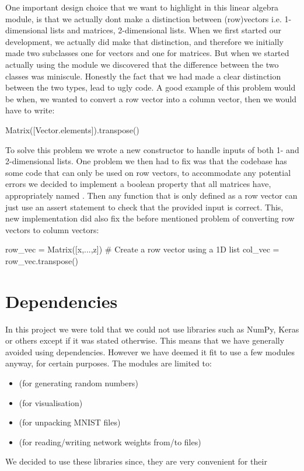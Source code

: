 \documentclass[a4paper,oneside,article,english]{memoir}
\begin{document}
One important design choice that we want to highlight in this linear algebra
module, is that we actually dont make a distinction between (row)vectors i.e.
1-dimensional lists and matrices, 2-dimensional lists. When we first started our
development, we actually did make that distinction, and therefore we initially
made two subclasses one for vectors and one for matrices. But when we started
actually using the module we discovered that the difference between the two
classes was miniscule. Honestly the fact that we had made a clear distinction
between the two types, lead to ugly code. A good example of this problem would
be when, we wanted to convert a row vector into a column vector, then we would
have to write:
\begin{python}
Matrix([Vector.elements]).transpose()
\end{python}
To solve this problem we wrote a new 
constructor to handle inputs of both 1- and 2-dimensional lists. One problem we
then had to fix was that the codebase has some code that can only be used on row
vectors, to accommodate any potential errors we decided to implement a boolean
property that all matrices have, appropriately named
. Then any function that is only defined as
a row vector can just use an assert statement to check that the provided
 input is correct. This, new implementation did also fix
the before mentioned problem of converting row vectors to column vectors:
\begin{python}
row_vec = Matrix([x,...,z]) # Create a row vector using a 1D list 
col_vec = row_vec.transpose() 
\end{python}



\section{Dependencies}  
\label{sec:dependencies}
In this project we were told that we could not use libraries such as NumPy,
Keras or others except if it was stated otherwise. This means that we have
generally avoided using dependencies. However we have deemed it fit to use a few
modules anyway, for certain purposes. The modules are limited to: 
\begin{itemize}
  \item
    \href{https://docs.python.org/3/library/random.html}{\underline{}}
    (for generating random numbers)
  \item \href{https://matplotlib.org}{\underline{}} (for
    visualisation)
  \item
    \href{https://docs.python.org/3/library/gzip.html}{\underline{}}
    (for unpacking MNIST  files)
  \item
    \href{https://docs.python.org/3/library/json.html}{\underline{}}
    (for reading/writing network weights from/to files)
\end{itemize}
We decided to use these libraries since, they are very convenient for their
\end{document}
